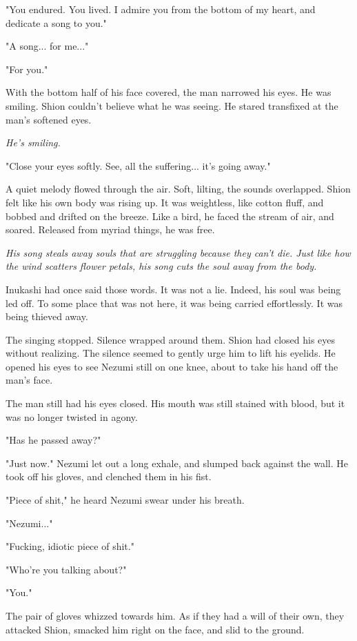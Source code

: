 "You endured. You lived. I admire you from the bottom of my heart, and
dedicate a song to you."

"A song... for me..."

"For you."

With the bottom half of his face covered, the man narrowed his eyes. He
was smiling. Shion couldn't believe what he was seeing. He stared
transfixed at the man's softened eyes.

\emph{He's smiling.}

"Close your eyes softly. See, all the suffering... it's going away."

A quiet melody flowed through the air. Soft, lilting, the sounds
overlapped. Shion felt like his own body was rising up. It was
weightless, like cotton fluff, and bobbed and drifted on the breeze.
Like a bird, he faced the stream of air, and soared. Released from
myriad things, he was free.

\emph{His song steals away souls that are struggling because they can't die.
Just like how the wind scatters flower petals, his song cuts the soul
away from the body.}

Inukashi had once said those words. It was not a lie. Indeed, his soul
was being led off. To some place that was not here, it was being carried
effortlessly. It was being thieved away.

\mybreak

The singing stopped. Silence wrapped around them. Shion had closed his
eyes without realizing. The silence seemed to gently urge him to lift
his eyelids. He opened his eyes to see Nezumi still on one knee, about
to take his hand off the man's face.

The man still had his eyes closed. His mouth was still stained with
blood, but it was no longer twisted in agony.~

"Has he passed away?"

"Just now." Nezumi let out a long exhale, and slumped back against the
wall. He took off his gloves, and clenched them in his fist.

"Piece of shit," he heard Nezumi swear under his breath.

"Nezumi..."

"Fucking, idiotic piece of shit."

"Who're you talking about?"

"You."

The pair of gloves whizzed towards him. As if they had a will of their
own, they attacked Shion, smacked him right on the face, and slid to the
ground.

